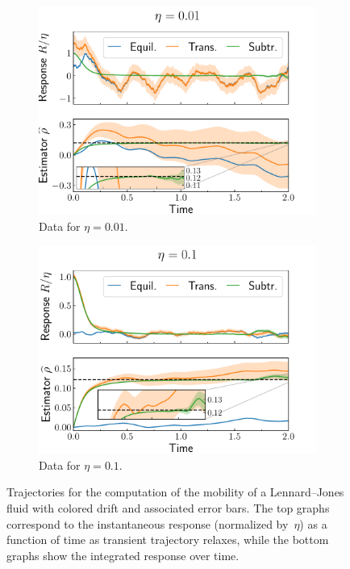\documentclass[11pt]{article}
\theoremstyle{definition}
\begin{document}
\begin{figure}[h!]
\centering
\begin{subfigure}{0.49\textwidth}
    \includegraphics[width=\textwidth]{LJ_mobility_0.01.pdf}
    \caption{Data for $\eta = 0.01$.}
    \label{subfig:mobility_0.01}
\end{subfigure}
\hfill
\begin{subfigure}{0.49\textwidth}
    \includegraphics[width=\textwidth]{LJ_mobility_0.1.pdf}
    \caption{Data for $\eta = 0.1$.}
    \label{subfig:mobility_0.1}
\end{subfigure}
\caption{Trajectories for the computation of the mobility of a Lennard--Jones fluid with colored drift and associated error bars. The top graphs correspond to the instantaneous response (normalized by~$\eta$) as a function of time as transient trajectory relaxes, while the bottom graphs show the integrated response over time.}
\label{fig:LJ_mobility}
\end{figure}
\end{document}
